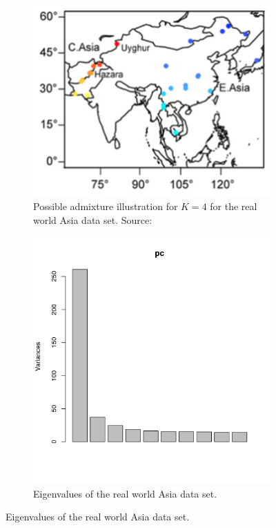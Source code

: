 \documentclass[a4paper, 11pt]{article}
\begin{document}
\begin{figure}
\centering
\begin{subfigure}
\centering
\includegraphics[scale=0.4]{asia_pop}
\caption{Possible admixture illustration for $K=4$ for the real world Asia data set. Source: \cite{frichot2012correcting}}
\end{subfigure}
\begin{subfigure}
\centering
\includegraphics[scale=0.6]{pc_asia}
\caption{Eigenvalues of the real world Asia data set.}
\end{subfigure}
\end{figure}
\end{document}

